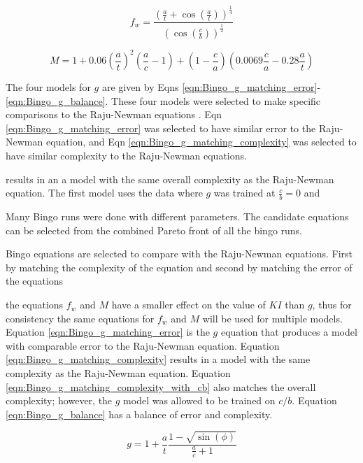 \begin{equation} \label{eqn:Bingo_fw_common}
    f_w = \frac{\left(\frac{a}{t} + \cos\left(\frac{a}{t}\right)\right)^{\frac{1}{4}}}{\left(\cos\left(\frac{c}{b}\right)\right)^{\frac{1}{2}}}
\end{equation}

\begin{equation} \label{eqn:Bingo_M_common}
    M = 1 + 0.06\left(\frac{a}{t}\right)^2\left(\frac{a}{c} - 1 \right) + \left(1 - \frac{c}{a} \right) \left(0.0069 \frac{c}{a} - 0.28 \frac{a}{t} \right)
\end{equation}

The four models for $g$ are given by Eqns \ref{eqn:Bingo_g_matching_error}-\ref{eqn:Bingo_g_balance}. These four models were selected to make specific comparisons to the Raju-Newman equations \cite{RNeqnsbook}. Eqn \ref{eqn:Bingo_g_matching_error} was selected to have similar error to the Raju-Newman equation, and Eqn \ref{eqn:Bingo_g_matching_complexity} was selected to have similar complexity to the Raju-Newman equations.



results in an a model with the same overall complexity as the Raju-Newman equation. 
The first model uses the data where $g$ was trained at $\frac{c}{b} = 0$ and 

Many Bingo runs were done with different parameters. The candidate equations can be selected from the combined Pareto front of all the bingo runs. 

Bingo equations are selected to compare with the Raju-Newman equations. First by matching the complexity of the equation and second by matching the error of the equations

the equations $f_w$ and $M$ have a smaller effect on the value of $KI$ than $g$, thus for consistency the same equations for $f_w$ and $M$ will be used for multiple models. Equation \ref{eqn:Bingo_g_matching_error} is the $g$ equation that produces a model with comparable error to the Raju-Newman equation. Equation \ref{eqn:Bingo_g_matching_complexity} results in a model with the same complexity as the Raju-Newman equation. Equation \ref{eqn:Bingo_g_matching_complexity_with_cb} also matches the overall complexity; however, the $g$ model was allowed to be trained on $c/b$. Equation \ref{eqn:Bingo_g_balance} has a balance of error and complexity. 

\begin{equation} \label{eqn:Bingo_g_matching_error}
    g = 1 + \frac{a}{t} \frac{1 - \sqrt{\sin \left( \phi \right)}}{\frac{a}{c} + 1}
\end{equation}

